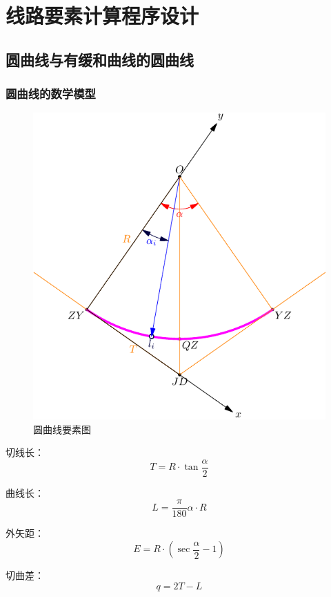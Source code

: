 ﻿%

\chapter{线路要素计算程序设计}

\section{圆曲线与有缓和曲线的圆曲线}

\subsection{圆曲线的数学模型}

\begin{figure}[htbp]
    \centering
    \includegraphics[scale=1]{route/CircleRoute.pdf}
    \caption{圆曲线要素图}
    \label{fig:CircleRoute}
\end{figure}

 
 切线长：$$T = R \cdot \tan \frac{\alpha}{2}$$

 曲线长：$$L = \frac{\pi}{180}\alpha \cdot R$$

 外矢距：$$E=R \cdot (\sec \frac{\alpha}{2} - 1)$$

 切曲差：$$q = 2T - L$$

